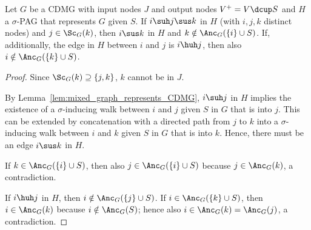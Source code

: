 \begin{Prp}\label{prp:inducing_edge_into_scc}
  Let $G$ be a CDMG with input nodes $J$ and output nodes $V^+ = V \dcup S$ and $H$ a $\sigma$-PAG that represents $G$ given $S$.
  If $i \suh j \sus k$ in $H$ (with $i,j,k$ distinct nodes) and $j \in \Sc_G(k)$, then $i \sus k$ in $H$ and $k \notin \Anc_G(\{i\} \cup S)$.
  If, additionally, the edge in $H$ between $i$ and $j$ is $i \huh j$, then also $i \notin \Anc_G(\{k\} \cup S)$.
\end{Prp}
\begin{proof}
Since $\Sc_G(k) \supseteq \{j,k\}$, $k$ cannot be in $J$.

By Lemma~\ref{lem:mixed_graph_represents_CDMG}, $i \suh j$ in $H$ implies the existence of a $\sigma$-inducing walk between $i$ and $j$ given $S$ in $G$ that is into $j$.
This can be extended by concatenation with a directed path from $j$ to $k$ into a $\sigma$-inducing walk between $i$ and $k$ given $S$ in $G$ that is into $k$.
Hence, there must be an edge $i \sus k$ in $H$.

If $k \in \Anc_G(\{i\} \cup S)$, then also $j \in \Anc_G(\{i\} \cup S)$ because $j \in \Anc_G(k)$, a contradiction.

If $i \huh j$ in $H$, then $i \notin \Anc_G(\{j\} \cup S)$.
If $i \in \Anc_G(\{k\} \cup S)$, then $i \in \Anc_G(k)$ because $i \notin \Anc_G(S)$; hence also $i \in \Anc_G(k) = \Anc_G(j)$, a contradiction.
\end{proof}

